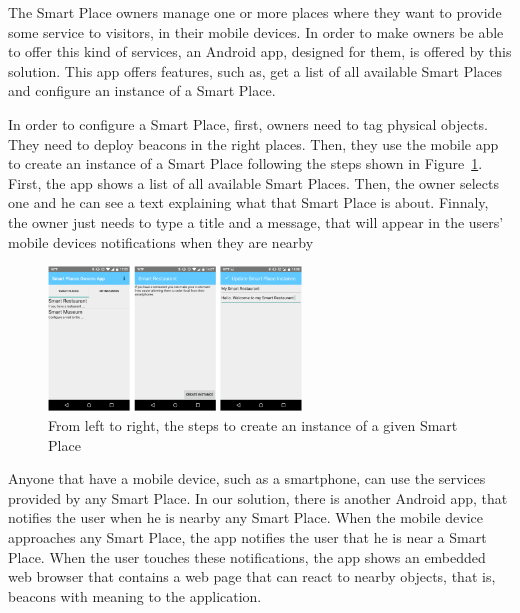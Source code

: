 The Smart Place owners manage one or more places where they want to provide some service to visitors, in their mobile devices.
In order to make owners be able to offer this kind of services, an Android app, designed for them, is offered by this solution.
This app offers features, such as, get a list of all available Smart Places and configure an instance of a Smart Place.

In order to configure a Smart Place, first, owners need to tag physical objects.
They need to deploy beacons in the right places.
Then, they use the mobile app to create an instance of a Smart Place following the steps shown in Figure~\ref{fig:screenshot_ownersapp}. First, the app shows a list of all available Smart Places.
Then, the owner selects one and he can see a text explaining what that Smart Place is about.
Finnaly, the owner just needs to type a title and a message, that will appear in the users' mobile devices notifications when they are nearby

\begin{figure}[!ht]
  \centering
    \includegraphics[width=0.6\textwidth, keepaspectratio]{figures/screenshots/ownersapp}
    \caption[Create a Smart Place Instance]{From left to right, the steps to create an instance of a given Smart Place}
    \label{fig:screenshot_ownersapp}
\end{figure}

Anyone that have a mobile device, such as a smartphone, can use the services provided by any Smart Place.
In our solution, there is another Android app, that notifies the user when he is nearby any Smart Place.
When the mobile device approaches any Smart Place, the app notifies the user that he is near a Smart Place.
When the user touches these notifications, the app shows an embedded web browser that contains a web page that can react to nearby objects, that is, beacons with meaning to the application.


